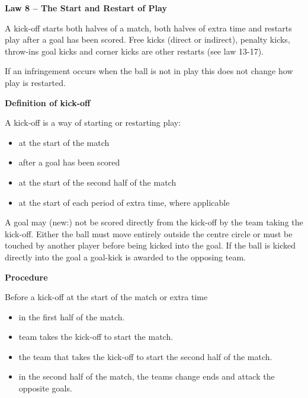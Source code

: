 \clearpage
\sffamily
{\bfseries\color[rgb]{0.4,0.4,0.4}
Law 8 -- The Start and Restart of Play}
{}

\bigskip

A kick-off starts both halves of a match, both halves of extra time and restarts
play after a goal has been scored.
Free kicks (direct or indirect), penalty kicks, throw-ins goal kicks and corner
kicks are other restarts (see law 13-17).

\bigskip

If an infringement occurs when the ball is not in play this does not change how
play is restarted.

\bigskip

{\bfseries Definition of kick-off}

\headlinebox

A kick-off is a way of starting or restarting play:

\begin{itemize}
\item at the start of the match 
\item after a goal has been scored 
\item at the start of the second half of the match 
\item at the start of each period of extra time, where applicable
\end{itemize}

A goal may (new:) not be scored directly from the kick-off by the team taking the kick-off.
Either the ball must move entirely outside the centre circle or must be touched
by another player before being kicked into the goal.
If the ball is kicked directly into the goal a goal-kick
is awarded to the opposing team.

\bigskip

{\bfseries Procedure }

\headlinebox

Before a kick-off at the start of the match or extra time 

\begin{itemize}
      \item {}  in the first half of the match.
      \item {}  team takes the kick-off to start the match. 
      \item the team that   takes the kick-off to start the second half of the match.
\item in the second half of the match, the teams change ends and attack the opposite goals. 
\end{itemize}

